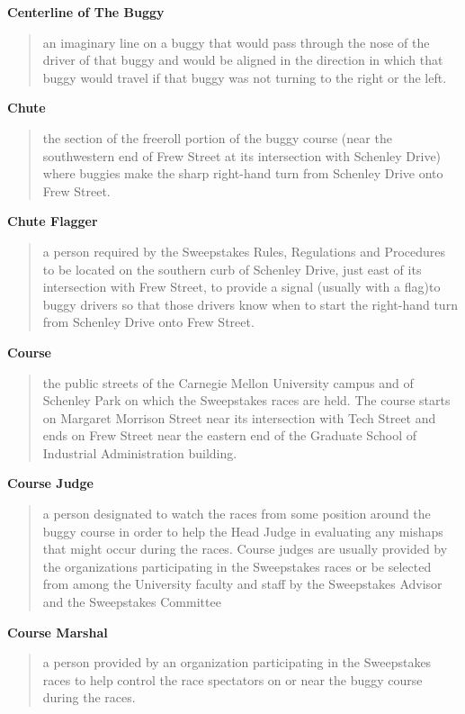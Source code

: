\textbf{Centerline of The Buggy}
\begin{quote}
	an imaginary line on a buggy that would pass through the nose of the driver of that buggy and would be aligned in the direction in which that buggy would travel if that buggy was not turning to the right or the left.
\end{quote}

\textbf{Chute}
\begin{quote}
	the section of the freeroll portion of the buggy course (near the southwestern end of Frew Street at its intersection with Schenley Drive) where buggies make the sharp right-hand turn from Schenley Drive onto Frew Street.
\end{quote}

\textbf{Chute Flagger}
\begin{quote}
	a person required by the Sweepstakes Rules, Regulations and Procedures to be located on the southern curb of Schenley Drive, just east of its intersection with Frew Street, to provide a signal (usually with a flag)to buggy drivers so that those drivers know when to start the right-hand turn from Schenley Drive onto Frew Street.
\end{quote}

\textbf{Course}
\begin{quote}
	the public streets of the Carnegie Mellon University campus and of Schenley Park on which the Sweepstakes races are held. The course starts on Margaret Morrison Street near its intersection with Tech Street and ends on Frew Street near the eastern end of the Graduate School of Industrial Administration building.
\end{quote}

\textbf{Course Judge}
\begin{quote}
	a person designated to watch the races from some position around the buggy course in order to help the Head Judge in evaluating any mishaps that might occur during the races. Course judges are usually provided by the organizations participating in the Sweepstakes races or be selected from among the University faculty and staff by the Sweepstakes Advisor and the Sweepstakes Committee
\end{quote}

\textbf{Course Marshal}
\begin{quote}
	a person provided by an organization participating in the Sweepstakes races to help control the race spectators on or near the buggy course during the races.
\end{quote}

